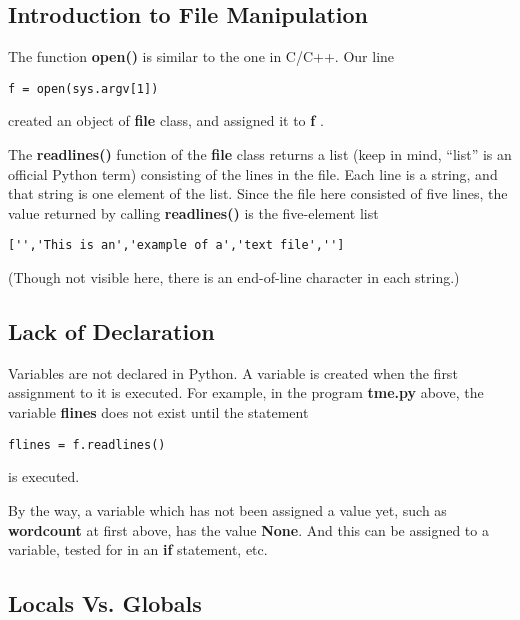 \subsection{Introduction to File Manipulation}
\label{files}

The function {\bf open()} is similar to the one in C/C++.  Our line

\begin{Verbatim}[fontsize=\relsize{-2}]
f = open(sys.argv[1])
\end{Verbatim}

created an object of {\bf file} class, and assigned it to {\bf f} .

The {\bf readlines()} function of the {\bf file} class returns a list
(keep in mind, ``list'' is an official Python term) consisting of the
lines in the file.  Each line is a string, and that string is one
element of the list.  Since the file here consisted of five lines, the
value returned by calling {\bf readlines()} is the five-element list

\begin{Verbatim}[fontsize=\relsize{-2}]
['','This is an','example of a','text file','']
\end{Verbatim}

(Though not visible here, there is an end-of-line character in each string.)

\subsection{Lack of Declaration}
\label{decl}

Variables are not declared in Python.  A variable is created when the
first assignment to it is executed.  For example, in the program {\bf
tme.py} above, the variable {\bf flines} does not exist until the
statement

\begin{Verbatim}[fontsize=\relsize{-2}]
flines = f.readlines()
\end{Verbatim}

is executed.  

By the way, a variable which has not been assigned a value yet, such as
{\bf wordcount} at first above, has the value {\bf None}. And this can
be assigned to a variable, tested for in an {\bf if} statement, etc.

\subsection{Locals Vs. Globals}

